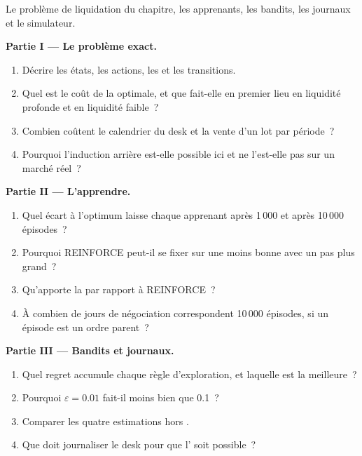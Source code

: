 \begin{problem}\label{pb:ml:reinforcement-learning-foundations:1}
Le problème de liquidation du chapitre, les apprenants, les bandits, les journaux et le simulateur.

\medskip\noindent\textbf{Partie I --- Le problème exact.}
\begin{enumerate}
\item Décrire les états, les actions, les  et les transitions.
\item Quel est le coût de la  optimale, et que fait-elle en premier lieu en liquidité profonde et en liquidité faible~?
\item Combien coûtent le calendrier du desk et la vente d'un lot par période~?
\item Pourquoi l'induction arrière est-elle possible ici et ne l'est-elle pas sur un marché réel~?
\end{enumerate}

\medskip\noindent\textbf{Partie II --- L'apprendre.}
\begin{enumerate}[resume]
\item Quel écart à l'optimum laisse chaque apprenant après 1\,000 et après 10\,000 épisodes~?
\item Pourquoi REINFORCE peut-il se fixer sur une  moins bonne avec un pas plus grand~?
\item Qu'apporte la  par rapport à REINFORCE~?
\item À combien de jours de négociation correspondent 10\,000 épisodes, si un épisode est un ordre parent~?
\end{enumerate}

\medskip\noindent\textbf{Partie III --- Bandits et journaux.}
\begin{enumerate}[resume]
\item Quel regret accumule chaque règle d'exploration, et laquelle est la meilleure~?
\item Pourquoi $\varepsilon = 0.01$ fait-il moins bien que 0.1~?
\item Comparer les quatre estimations hors .
\item Que doit journaliser le desk pour que l' soit possible~?
\end{enumerate}


\end{problem}

